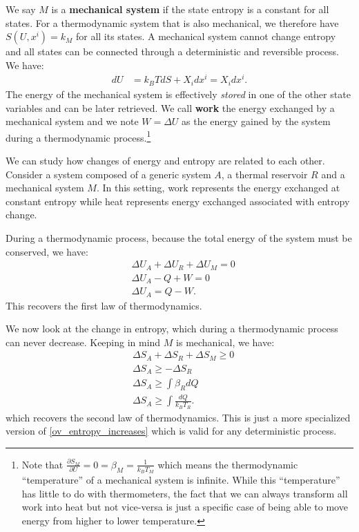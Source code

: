 \documentclass[letterpaper,twocolumn]{article}
\begin{document}
We say $M$ is a \textbf{mechanical system} if the state entropy is a constant for all states. For a thermodynamic system that is also mechanical, we therefore have  $S(U, x^i) = k_M$ for all its states. A mechanical system cannot change entropy and all states can be connected through a deterministic and reversible process. We have:
\begin{equation}
\begin{aligned}
dU &= k_B T dS + X_i dx^i = X_i dx^i.
\end{aligned}
\end{equation}
The energy of the mechanical system is effectively \emph{stored} in one of the other state variables and can be later retrieved. We call \textbf{work} the energy exchanged by a mechanical system and we note $W=\Delta U$ as the energy gained by the system during a thermodynamic process.\footnote{Note that $\frac{\partial S_M}{\partial U} = 0 = \beta_M = \frac{1}{k_B T_M}$ which means the thermodynamic ``temperature'' of a mechanical system is infinite. While this ``temperature'' has little to do with thermometers, the fact that we can always transform all work into heat but not vice-versa is just a specific case of being able to move energy from higher to lower temperature.}

We can study how changes of energy and entropy are related to each other. Consider a system composed of a generic system $A$, a thermal reservoir $R$ and a mechanical system $M$. In this setting, work represents the energy exchanged at constant entropy while heat represents energy exchanged associated with entropy change.

During a thermodynamic process, because the total energy of the system must be conserved, we have:
\begin{equation}
\begin{aligned}
&\Delta U_A + \Delta U_R + \Delta U_M = 0 \\
&\Delta U_A - Q + W = 0 \\
&\Delta U_A = Q - W.
\end{aligned}
\end{equation}
This recovers the first law of thermodynamics.

We now look at the change in entropy, which during a thermodynamic process can never decrease. Keeping in mind $M$ is mechanical, we have:
\begin{equation}
\begin{aligned}
&\Delta S_A + \Delta S_R + \Delta S_M \geq 0 \\
&\Delta S_A \geq - \Delta S_R \\
&\Delta S_A \geq \int \beta_R dQ \\
&\Delta S_A \geq \int \frac{dQ}{k_B T_R}.
\end{aligned}
\end{equation}
which recovers the second law of thermodynamics. This is just a more specialized version of \eqref{ov_entropy_increases} which is valid for any deterministic process.
\end{document}
